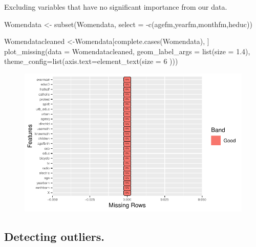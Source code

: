 \documentclass[
  letterpaper,
  DIV=11,
  numbers=noendperiod]{scrartcl}
\newenvironment{Shaded}{\begin{snugshade}}{\end{snugshade}}
\newcommand{\AttributeTok}[1]{\textcolor[rgb]{0.40,0.45,0.13}{#1}}
\newcommand{\DecValTok}[1]{\textcolor[rgb]{0.68,0.00,0.00}{#1}}
\newcommand{\FloatTok}[1]{\textcolor[rgb]{0.68,0.00,0.00}{#1}}
\newcommand{\FunctionTok}[1]{\textcolor[rgb]{0.28,0.35,0.67}{#1}}
\newcommand{\NormalTok}[1]{\textcolor[rgb]{0.00,0.23,0.31}{#1}}
\newcommand{\OtherTok}[1]{\textcolor[rgb]{0.00,0.23,0.31}{#1}}
\newcommand{\SpecialCharTok}[1]{\textcolor[rgb]{0.37,0.37,0.37}{#1}}
\begin{document}
Excluding variables that have no significant importance from our data.

\begin{Shaded}
\begin{Highlighting}[]
\NormalTok{Womendata }\OtherTok{\textless{}{-}} \FunctionTok{subset}\NormalTok{(Womendata, }\AttributeTok{select =} \SpecialCharTok{{-}}\FunctionTok{c}\NormalTok{(agefm,yearfm,monthfm,heduc))}
\end{Highlighting}
\end{Shaded}

\begin{Shaded}
\begin{Highlighting}[]
\NormalTok{Womendatacleaned }\OtherTok{\textless{}{-}}\NormalTok{Womendata[}\FunctionTok{complete.cases}\NormalTok{(Womendata), ]}
\FunctionTok{plot\_missing}\NormalTok{(}\AttributeTok{data =}\NormalTok{ Womendatacleaned, }\AttributeTok{geom\_label\_args =} \FunctionTok{list}\NormalTok{(}\AttributeTok{size =} \FloatTok{1.4}\NormalTok{), }\AttributeTok{theme\_config=}\FunctionTok{list}\NormalTok{(}\AttributeTok{axis.text=}\FunctionTok{element\_text}\NormalTok{(}\AttributeTok{size =} \DecValTok{6}\NormalTok{ )))}
\end{Highlighting}
\end{Shaded}

\begin{figure}[H]

{\centering \includegraphics{Fertility_Rates_Education_Impact_Botswana_files/figure-pdf/unnamed-chunk-12-1.pdf}

}

\end{figure}

\hypertarget{detecting-outliers.}{%
\subsection{Detecting outliers.}\label{detecting-outliers.}}
\end{document}
